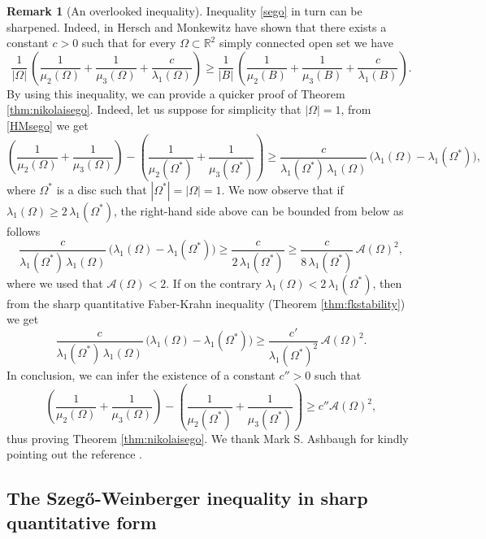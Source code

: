 \documentclass{amsart}
\theoremstyle{definition}
\newtheorem{remark}[lemma]{Remark}
\numberwithin{equation}{section}
\begin{document}
\begin{remark}[An overlooked inequality]
\label{oss:mark}
Inequality \eqref{sego} in turn can be sharpened. Indeed, in \cite{MR0295172} Hersch and Monkewitz have shown that there exists a constant $c>0$ such that for every $\Omega\subset\mathbb{R}^2$ simply connected open set we have
\begin{equation}
\label{HMsego}
\frac{1}{|\Omega|}\,\left(\frac{1}{\mu_2(\Omega)}+\frac{1}{\mu_3(\Omega)}+\frac{c}{\lambda_1(\Omega)}\right)\ge \frac{1}{|B|}\,\left(\frac{1}{\mu_2(B)}+\frac{1}{\mu_3(B)}+\frac{c}{\lambda_1(B)}\right).
\end{equation}
By using this inequality, we can provide a quicker proof of Theorem \ref{thm:nikolaisego}.
Indeed, let us suppose for simplicity that $|\Omega|=1$, from \eqref{HMsego} we get
\[
\left(\frac{1}{\mu_2(\Omega)}+\frac{1}{\mu_3(\Omega)}\right)-\left(\frac{1}{\mu_2(\Omega^*)}+\frac{1}{\mu_3(\Omega^*)}\right)\ge \frac{c}{\lambda_1(\Omega^*)\,\lambda_1(\Omega)}\,\Big(\lambda_1(\Omega)-\lambda_1(\Omega^*)\Big),
\]
where $\Omega^*$ is a disc such that $|\Omega^*|=|\Omega|=1$. We now observe that if $\lambda_1(\Omega)\ge 2\,\lambda_1(\Omega^*)$, the right-hand side above can be bounded from below as follows
\[
\frac{c}{\lambda_1(\Omega^*)\,\lambda_1(\Omega)}\,\Big(\lambda_1(\Omega)-\lambda_1(\Omega^*)\Big)\ge \frac{c}{2\,\lambda_1(\Omega^*)}\ge \frac{c}{8\,\lambda_1(\Omega^*)}\,\mathcal{A}(\Omega)^2,
\]
where we used that $\mathcal{A}(\Omega)<2$.
If on the contrary $\lambda_1(\Omega)<2\,\lambda_1(\Omega^*)$, then from the sharp quantitative Faber-Krahn inequality (Theorem \ref{thm:fkstability}) we get
\[
\frac{c}{\lambda_1(\Omega^*)\,\lambda_1(\Omega)}\,\Big(\lambda_1(\Omega)-\lambda_1(\Omega^*)\Big)\ge \frac{c'}{\lambda_1(\Omega^*)^2}\,\mathcal{A}(\Omega)^2.
\] 
In conclusion, we can infer the existence of a constant $c''>0$ such that
\[
\left(\frac{1}{\mu_2(\Omega)}+\frac{1}{\mu_3(\Omega)}\right)-\left(\frac{1}{\mu_2(\Omega^*)}+\frac{1}{\mu_3(\Omega^*)}\right)\ge c''\mathcal{A}(\Omega)^2,
\]
thus proving Theorem \ref{thm:nikolaisego}. We thank Mark S. Ashbaugh for kindly pointing out the reference \cite{MR0295172}.
\end{remark}


\subsection{The Szeg\H{o}-Weinberger inequality in sharp quantitative form}
\end{document}

